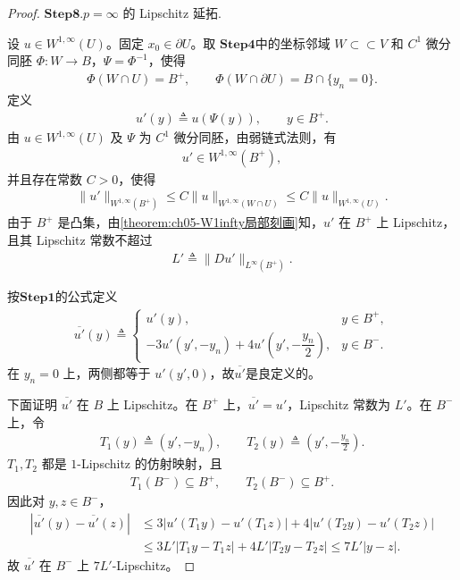 \documentclass[../../main.tex]{subfiles}
\begin{document}
\begin{proof}
\noindent$\mathbf{Step}\bm{8}$.{\heiti \(p=\infty\) 的 Lipschitz 延拓.}

设 \(u\in W^{1,\infty}(U)\)。固定 \(x_0\in\partial U\)。取 $\mathbf{Step 4}$中的坐标邻域 \(W\subset\subset V\) 和 \(C^1\) 微分同胚 \(\Phi:W\to B\)，\(\Psi=\Phi^{-1}\)，使得
\begin{align*}
\Phi(W\cap U)=B^+,\qquad
\Phi(W\cap\partial U)=B\cap\{y_n=0\}.
\end{align*}
定义
\begin{align*}
u'(y)\triangleq u(\Psi(y)),\qquad y\in B^+.
\end{align*}
由 \(u\in W^{1,\infty}(U)\) 及 \(\Psi\) 为 \(C^1\) 微分同胚，由弱链式法则，有
\begin{align*}
u'\in W^{1,\infty}(B^+),
\end{align*}
并且存在常数 \(C>0\)，使得
\begin{align}
\|u'\|_{W^{1,\infty}(B^+)}
\leqslant C\|u\|_{W^{1,\infty}(W\cap U)}
\leqslant C\|u\|_{W^{1,\infty}(U)}.
\label{eq:u'-W1infty估计}
\end{align}
由于 \(B^+\) 是凸集，由\cref{theorem:ch05-W1infty局部刻画}知，\(u'\) 在 \(B^+\) 上 Lipschitz，且其 Lipschitz 常数不超过
\begin{align*}
L'\triangleq\|Du'\|_{L^\infty(B^+)}.
\end{align*}

按$\mathbf{Step 1}$的公式定义
\begin{align*}
\overline{u'}(y)\triangleq
\begin{cases}
u'(y), & y\in B^+,\\[4pt]
-3u'(y',-y_n)+4u'\left(y',-\dfrac{y_n}{2}\right), & y\in B^-.
\end{cases}
\end{align*}
在 \(y_n=0\) 上，两侧都等于 \(u'(y',0)\)，故$\overline{u'}$是良定义的。

下面证明 \(\overline{u'}\) 在 \(B\) 上 Lipschitz。在 \(B^+\) 上，\(\overline{u'}=u'\)，Lipschitz 常数为 \(L'\)。在 \(B^-\) 上，令
\begin{align*}
T_1(y)\triangleq(y',-y_n),\qquad
T_2(y)\triangleq\left(y',-\frac{y_n}{2}\right).
\end{align*}
\(T_1,T_2\) 都是 \(1\)-Lipschitz 的仿射映射，且
\begin{align*}
T_1(B^-)\subseteq B^+,\qquad
T_2(B^-)\subseteq B^+.
\end{align*}
因此对 \(y,z\in B^-\)，
\begin{align*}
|\overline{u'}(y)-\overline{u'}(z)|
&\leqslant3|u'(T_1y)-u'(T_1z)|
+4|u'(T_2y)-u'(T_2z)|\\
&\leqslant3L'|T_1y-T_1z|+4L'|T_2y-T_2z|
\leqslant7L'|y-z|.
\end{align*}
故 \(\overline{u'}\) 在 \(B^-\) 上 \(7L'\)-Lipschitz。


\end{proof}
\end{document}
